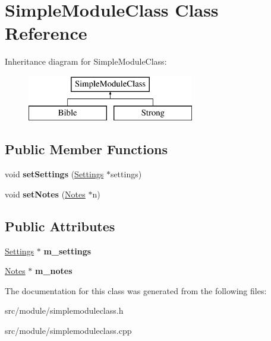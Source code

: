 \hypertarget{classSimpleModuleClass}{
\section{SimpleModuleClass Class Reference}
\label{classSimpleModuleClass}
}
Inheritance diagram for SimpleModuleClass:\begin{figure}[H]
\begin{center}
\leavevmode
\includegraphics[height=2cm]{classSimpleModuleClass}
\end{center}
\end{figure}
\subsection*{Public Member Functions}
\begin{DoxyCompactItemize}
\item 
\hypertarget{classSimpleModuleClass_a9791d744bd52f1115f2729ce51578e59}{
void {\bfseries setSettings} (\hyperlink{classSettings}{Settings} $\ast$settings)}
\label{classSimpleModuleClass_a9791d744bd52f1115f2729ce51578e59}

\item 
\hypertarget{classSimpleModuleClass_aad18677ca04f2de2fa04996174dc0c0d}{
void {\bfseries setNotes} (\hyperlink{classNotes}{Notes} $\ast$n)}
\label{classSimpleModuleClass_aad18677ca04f2de2fa04996174dc0c0d}

\end{DoxyCompactItemize}
\subsection*{Public Attributes}
\begin{DoxyCompactItemize}
\item 
\hypertarget{classSimpleModuleClass_a1b325af63815f10b4240857ed5ba4a4e}{
\hyperlink{classSettings}{Settings} $\ast$ {\bfseries m\_\-settings}}
\label{classSimpleModuleClass_a1b325af63815f10b4240857ed5ba4a4e}

\item 
\hypertarget{classSimpleModuleClass_a6884eff138f2f302c14ade7ab349037e}{
\hyperlink{classNotes}{Notes} $\ast$ {\bfseries m\_\-notes}}
\label{classSimpleModuleClass_a6884eff138f2f302c14ade7ab349037e}

\end{DoxyCompactItemize}


The documentation for this class was generated from the following files:\begin{DoxyCompactItemize}
\item 
src/module/simplemoduleclass.h\item 
src/module/simplemoduleclass.cpp\end{DoxyCompactItemize}

